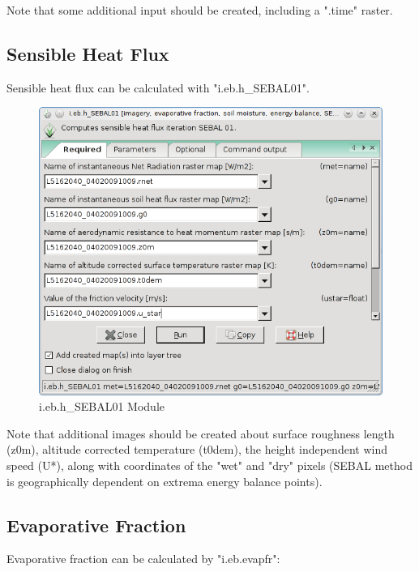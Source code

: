 Note that some additional input should be created, including a ".time" raster.\newline

\subsection{Sensible Heat Flux}
Sensible heat flux can be calculated with "i.eb.h\_SEBAL01".\newline

\begin{figure}[htbp]
   \centering
   \includegraphics[scale=0.4]{gipe027.png}
   \caption{i.eb.h\_SEBAL01 Module}
   \label{fig:gipe027}
\end{figure}

Note that additional images should be created about surface roughness length (z0m), altitude corrected temperature (t0dem), the height independent wind speed (U*), along with coordinates of the "wet" and "dry" pixels (SEBAL method is geographically dependent on extrema energy balance points). \newline

\subsection{Evaporative Fraction}
Evaporative fraction can be calculated by "i.eb.evapfr":\newline

